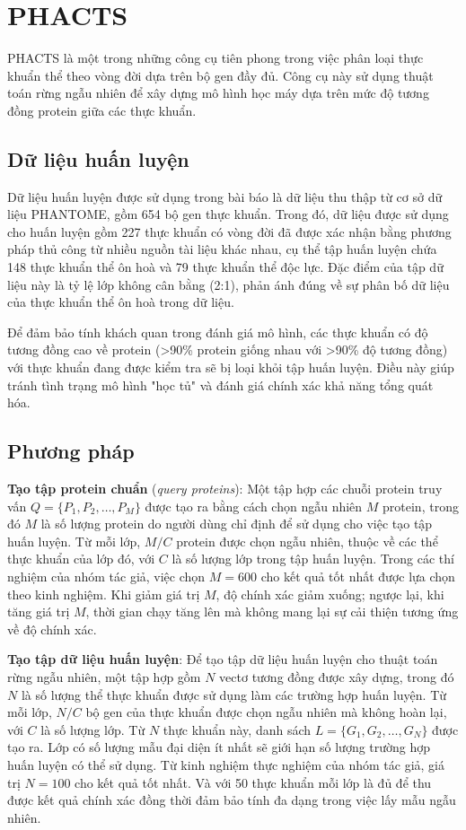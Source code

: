 \section{PHACTS}

PHACTS\cite{mcnair2012phacts} là một trong những công cụ tiên phong trong việc phân loại thực khuẩn thể theo vòng đời dựa trên bộ gen đầy đủ. Công cụ này sử dụng thuật toán rừng ngẫu nhiên để xây dựng mô hình học máy dựa trên mức độ tương đồng protein giữa các thực khuẩn.

\subsection{Dữ liệu huấn luyện}
Dữ liệu huấn luyện được sử dụng trong bài báo là dữ liệu thu thập từ cơ sở dữ liệu PHANTOME, gồm 654 bộ gen thực khuẩn. Trong đó, dữ liệu được sử dụng cho huấn luyện gồm 227 thực khuẩn có vòng đời đã được xác nhận bằng phương pháp thủ công từ nhiều nguồn tài liệu khác nhau, cụ thể tập huấn luyện chứa 148 thực khuẩn thể ôn hoà và 79 thực khuẩn thể độc lực. Đặc điểm của tập dữ liệu này là tỷ lệ lớp không cân bằng (2:1), phản ánh đúng về sự phân bố dữ liệu của thực khuẩn thể ôn hoà trong dữ liệu.

Để đảm bảo tính khách quan trong đánh giá mô hình, các thực khuẩn có độ tương đồng cao về protein (>90\% protein giống nhau với >90\% độ tương đồng) với thực khuẩn đang được kiểm tra sẽ bị loại khỏi tập huấn luyện. Điều này giúp tránh tình trạng mô hình "học tủ" và đánh giá chính xác khả năng tổng quát hóa.

\subsection{Phương pháp}

\textbf{Tạo tập protein chuẩn} (\textit{query proteins}): Một tập hợp các chuỗi protein truy vấn \( Q = \{P_1, P_2, \ldots, P_M\} \) được tạo ra bằng cách chọn ngẫu nhiên \( M \) protein, trong đó \( M \) là số lượng protein do người dùng chỉ định để sử dụng cho việc tạo tập huấn luyện. Từ mỗi lớp, \( M/C \) protein được chọn ngẫu nhiên, thuộc về các thể thực khuẩn của lớp đó, với \( C \) là số lượng lớp trong tập huấn luyện. Trong các thí nghiệm của nhóm tác giả, việc chọn \( M = 600 \) cho kết quả tốt nhất được lựa chọn theo kinh nghiệm. Khi giảm giá trị \( M \), độ chính xác giảm xuống; ngược lại, khi tăng giá trị \( M \), thời gian chạy tăng lên mà không mang lại sự cải thiện tương ứng về độ chính xác.

\textbf{Tạo tập dữ liệu huấn luyện}: Để tạo tập dữ liệu huấn luyện cho thuật toán rừng ngẫu nhiên, một tập hợp gồm \( N \) vectơ tương đồng được xây dựng, trong đó \( N \) là số lượng thể thực khuẩn được sử dụng làm các trường hợp huấn luyện. Từ mỗi lớp, \( N/C \) bộ gen của thực khuẩn được chọn ngẫu nhiên mà không hoàn lại, với \( C \) là số lượng lớp. Từ \( N \) thực khuẩn này, danh sách \( L = \{G_1, G_2, \ldots, G_N\} \) được tạo ra. Lớp có số lượng mẫu đại diện ít nhất sẽ giới hạn số lượng trường hợp huấn luyện có thể sử dụng. Từ kinh nghiệm thực nghiệm của nhóm tác giả, giá trị \( N = 100 \) cho kết quả tốt nhất. Và với 50 thực khuẩn mỗi lớp là đủ để thu được kết quả chính xác đồng thời đảm bảo tính đa dạng trong việc lấy mẫu ngẫu nhiên. 

